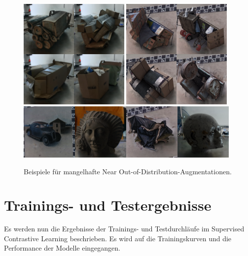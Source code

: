 \begin{figure}
	\centering
	\includegraphics[width=0.48\textwidth]{figure_results_ood-augs_bad_1.png}%
	\hspace{0.02\textwidth}\includegraphics[width=0.48\textwidth]{figure_results_ood-augs_bad_2.png}\vspace{0.01\textwidth}
	\includegraphics[width=0.98\textwidth]{figure_results_ood-augs_bad_4.png}
	\caption{Beispiele für mangelhafte Near Out-of-Distribution-Augmentationen.}
	\label{fig:ood-augs-bad}
\end{figure}

\section{Trainings- und Testergebnisse} \label{sec:supcon-results}

Es werden nun die Ergebnisse der Trainings- und Testdurchläufe im Supervised Contrastive Learning beschrieben. Es wird auf die Trainingskurven und die Performance der Modelle eingegangen.

